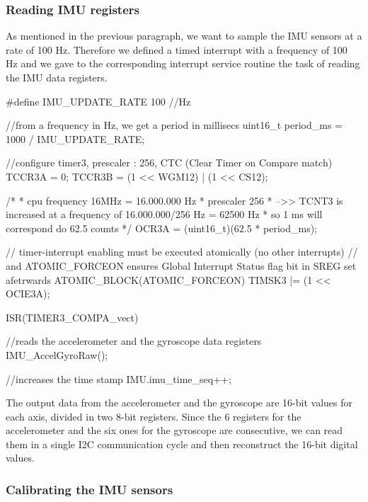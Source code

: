 \subsubsection{Reading IMU registers}

As mentioned in the previous paragraph, we want to sample the IMU sensors at a rate of 100 Hz. Therefore we defined a timed interrupt with a frequency of 100 Hz and we gave to the corresponding interrupt service routine the task of reading the IMU data registers.
\begin{ccode}
	#define IMU_UPDATE_RATE 100 //Hz

	//from a frequency in Hz, we get a period in millisecs
 uint16_t period_ms = 1000 / IMU_UPDATE_RATE;
 
 //configure timer3, prescaler : 256, CTC (Clear Timer on Compare match)
 TCCR3A = 0;
 TCCR3B = (1 << WGM12) | (1 << CS12); 
 
 /*
	 * cpu frequency 16MHz = 16.000.000 Hz
	 * prescaler 256
	 *	-->> TCNT3 is increased at a frequency of 16.000.000/256 Hz = 62500 Hz
	 *	so 1 ms will correspond do 62.5 counts
	 */
 OCR3A = (uint16_t)(62.5 * period_ms);

	// timer-interrupt enabling must be executed atomically (no other interrupts)
		// and ATOMIC_FORCEON ensures Global Interrupt Status flag bit in SREG set afetrwards
 ATOMIC_BLOCK(ATOMIC_FORCEON) {
 	TIMSK3 |= (1 << OCIE3A);
 }
\end{ccode}

\begin{ccode}
	ISR(TIMER3_COMPA_vect) {
		//reads the accelerometer and the gyroscope data registers
		IMU_AccelGyroRaw();

		//increases the time stamp
		IMU.imu_time_seq++;
	}
\end{ccode}

The output data from the accelerometer and the gyroscope are 16-bit values for each axis, divided in two 8-bit registers. Since the 6 registers for the accelerometer and the six ones for the gyroscope are consecutive, we can read them in a single I2C communication cycle and then reconstruct the 16-bit digital values.

\subsubsection{Calibrating the IMU sensors}


